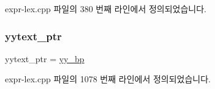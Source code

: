 expr-\/lex.\+cpp 파일의 380 번째 라인에서 정의되었습니다.

\mbox{\label{expr-lex_8cpp_ad6fabaea416e87b0f79fc34741e70818}} 
\subsubsection{\texorpdfstring{yytext\+\_\+ptr}{yytext\_ptr}}
{\footnotesize\ttfamily yytext\+\_\+ptr = \mbox{\hyperlink{expr-lex_8cpp_a71cf769ce518e8687bf8999b278c65f4}{yy\+\_\+bp}}}



expr-\/lex.\+cpp 파일의 1078 번째 라인에서 정의되었습니다.

